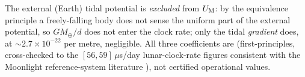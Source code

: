 The external (Earth) tidal potential is \emph{excluded} from $U_{\mathrm{M}}$: by the equivalence
principle a freely-falling body does not sense the uniform part of the external potential, so
$GM_{\oplus}/d$ does not enter the clock rate; only the tidal \emph{gradient} does, at
$\sim2.7\times10^{-22}$ per metre, negligible. All three coefficients are \Modelled{}
(first-principles, cross-checked to the $[56,59]\,\mu$s/day lunar-clock-rate figures
consistent with the Moonlight reference-system literature \citep{fienga2024moonlight}), not
certified operational values.
